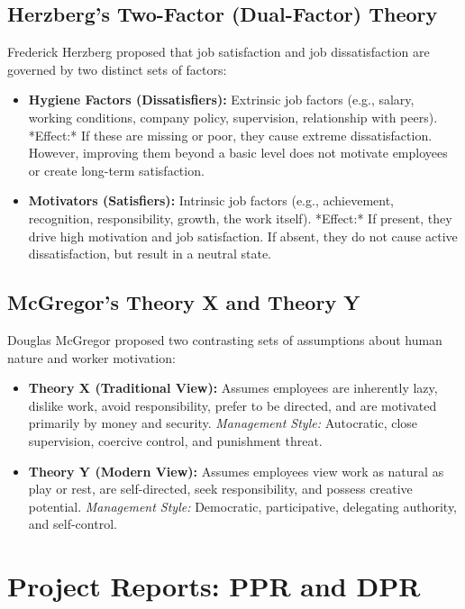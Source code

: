 \documentclass[12pt,a4paper]{article}
\begin{document}
\subsection{Herzberg's Two-Factor (Dual-Factor) Theory}
Frederick Herzberg proposed that job satisfaction and job dissatisfaction are governed by two distinct sets of factors:
\begin{itemize}[leftmargin=*, itemsep=3.5pt]
  \item \textbf{Hygiene Factors (Dissatisfiers):} Extrinsic job factors (e.g., salary, working conditions, company policy, supervision, relationship with peers).
    *Effect:* If these are missing or poor, they cause extreme dissatisfaction. However, improving them beyond a basic level does not motivate employees or create long-term satisfaction.
  \item \textbf{Motivators (Satisfiers):} Intrinsic job factors (e.g., achievement, recognition, responsibility, growth, the work itself).
    *Effect:* If present, they drive high motivation and job satisfaction. If absent, they do not cause active dissatisfaction, but result in a neutral state.
\end{itemize}

\subsection{McGregor's Theory X and Theory Y}
Douglas McGregor proposed two contrasting sets of assumptions about human nature and worker motivation:
\begin{itemize}[leftmargin=*, itemsep=3.5pt]
  \item \textbf{Theory X (Traditional View):} Assumes employees are inherently lazy, dislike work, avoid responsibility, prefer to be directed, and are motivated primarily by money and security.
    \textit{Management Style:} Autocratic, close supervision, coercive control, and punishment threat.
  \item \textbf{Theory Y (Modern View):} Assumes employees view work as natural as play or rest, are self-directed, seek responsibility, and possess creative potential.
    \textit{Management Style:} Democratic, participative, delegating authority, and self-control.
\end{itemize}

\section{Project Reports: PPR and DPR}
\end{document}

